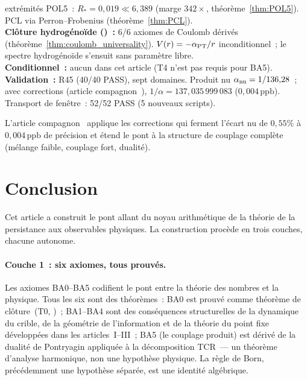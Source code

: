 \documentclass[12pt,a4paper]{article}
\begin{document}
\begin{ledgerbox}
  extrémités POL5~: $R_* = 0{,}019 \ll 6{,}389$ (marge
  $342\times$, théorème~\ref{thm:POL5}). PCL via
  Perron--Frobenius (théorème~\ref{thm:PCL}).\\[4pt]
\textbf{Clôture hydrogénoïde (\THMTAG)~:} 6/6 axiomes de Coulomb
  dérivés (théorème~\ref{thm:coulomb_universality}).
  $V(r) = -\alpha_{\rm PT}/r$ inconditionnel~; le spectre
  hydrogénoïde s'ensuit sans paramètre libre.\\[4pt]
\textbf{Conditionnel~:} aucun dans cet article (T4 n'est pas
  requis pour BA5).\\[4pt]
\textbf{Validation~:} R45 (40/40 PASS), sept domaines. Produit
  nu $\alpha_{\rm nu} = 1/136{,}28$~; avec corrections (article
  compagnon~\cite{companion_physics}),
  $1/\alpha = 137{,}035\,999\,083$ ($0{,}004\,\mathrm{ppb}$).
  Transport de fenêtre~: 52/52 PASS (5 nouveaux scripts).
\end{ledgerbox}

\medskip
L'article compagnon~\cite{companion_physics} applique les
corrections qui ferment l'écart nu de $0{,}55\%$ à
$0{,}004\,\mathrm{ppb}$ de précision et étend le pont à la
structure de couplage complète (mélange faible, couplage fort,
dualité).


\newpage

\section{Conclusion}
\label{sec:conclusion}

Cet article a construit le pont allant du noyau arithmétique de la
théorie de la persistance aux observables physiques. La
construction procède en trois couches, chacune autonome.

\paragraph{Couche 1~: six axiomes, tous prouvés.}
Les axiomes BA0--BA5 codifient le pont entre la théorie des nombres
et la physique. Tous les six sont des théorèmes~: BA0 est prouvé
comme théorème de clôture~(T0, \cite{companion_M3})~; BA1--BA4 sont
des conséquences structurelles de la dynamique du crible, de la
géométrie de l'information et de la théorie du point fixe
développées dans les articles~I--III~; BA5 (le couplage produit)
est dérivé de la dualité de Pontryagin appliquée à la décomposition
TCR~--- un théorème d'analyse harmonique, non une hypothèse
physique. La règle de Born, précédemment une hypothèse séparée,
est une identité algébrique.
\end{document}
